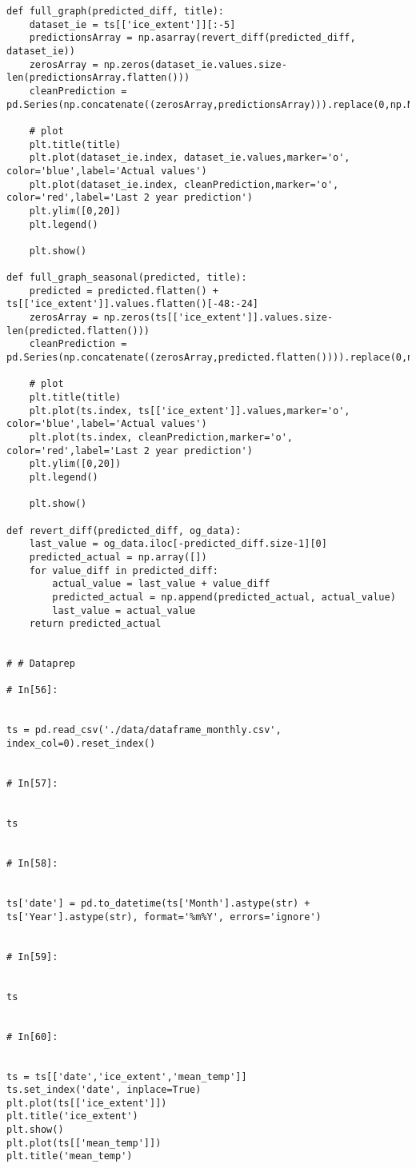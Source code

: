 \begin{verbatim}
def full_graph(predicted_diff, title):
    dataset_ie = ts[['ice_extent']][:-5]
    predictionsArray = np.asarray(revert_diff(predicted_diff, dataset_ie))
    zerosArray = np.zeros(dataset_ie.values.size-len(predictionsArray.flatten()))
    cleanPrediction = pd.Series(np.concatenate((zerosArray,predictionsArray))).replace(0,np.NaN)
    
    # plot
    plt.title(title)
    plt.plot(dataset_ie.index, dataset_ie.values,marker='o', color='blue',label='Actual values')
    plt.plot(dataset_ie.index, cleanPrediction,marker='o', color='red',label='Last 2 year prediction')
    plt.ylim([0,20])
    plt.legend()

    plt.show()
    
def full_graph_seasonal(predicted, title):
    predicted = predicted.flatten() + ts[['ice_extent']].values.flatten()[-48:-24]
    zerosArray = np.zeros(ts[['ice_extent']].values.size-len(predicted.flatten()))
    cleanPrediction = pd.Series(np.concatenate((zerosArray,predicted.flatten()))).replace(0,np.NaN)
    
    # plot
    plt.title(title)
    plt.plot(ts.index, ts[['ice_extent']].values,marker='o', color='blue',label='Actual values')
    plt.plot(ts.index, cleanPrediction,marker='o', color='red',label='Last 2 year prediction')
    plt.ylim([0,20])
    plt.legend()

    plt.show()
    
def revert_diff(predicted_diff, og_data):
    last_value = og_data.iloc[-predicted_diff.size-1][0]
    predicted_actual = np.array([])
    for value_diff in predicted_diff:
        actual_value = last_value + value_diff
        predicted_actual = np.append(predicted_actual, actual_value)
        last_value = actual_value
    return predicted_actual


# # Dataprep

# In[56]:


ts = pd.read_csv('./data/dataframe_monthly.csv', index_col=0).reset_index()


# In[57]:


ts


# In[58]:


ts['date'] = pd.to_datetime(ts['Month'].astype(str) + ts['Year'].astype(str), format='%m%Y', errors='ignore')


# In[59]:


ts


# In[60]:


ts = ts[['date','ice_extent','mean_temp']]
ts.set_index('date', inplace=True)
plt.plot(ts[['ice_extent']])
plt.title('ice_extent')
plt.show()
plt.plot(ts[['mean_temp']])
plt.title('mean_temp')



\end{verbatim}
